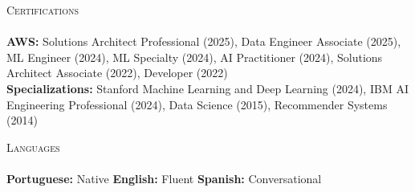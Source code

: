 \documentclass[a4paper]{article}
\newcommand{\lineunder} {
    \vspace*{-8pt} \\
    \hspace*{-18pt} \hrulefill \\
}
\newcommand{\header} [1] {
    {\hspace*{-18pt}\vspace*{6pt} \textsc{#1}}
    \vspace*{-6pt} \lineunder
}
\begin{document}
\header{Certifications}
\vspace{1mm}
\textbf{AWS:} Solutions Architect Professional (2025), Data Engineer Associate (2025), ML Engineer (2024), ML Specialty (2024), AI Practitioner (2024), Solutions Architect Associate (2022), Developer (2022)\\
\textbf{Specializations:} Stanford Machine Learning and Deep Learning (2024), IBM AI Engineering Professional (2024), Data Science (2015), Recommender Systems (2014)\\
\vspace{1mm}

\header{Languages}
\vspace{1mm}
\textbf{Portuguese:} Native \hfill \textbf{English:} Fluent \hfill \textbf{Spanish:} Conversational
\end{document}

